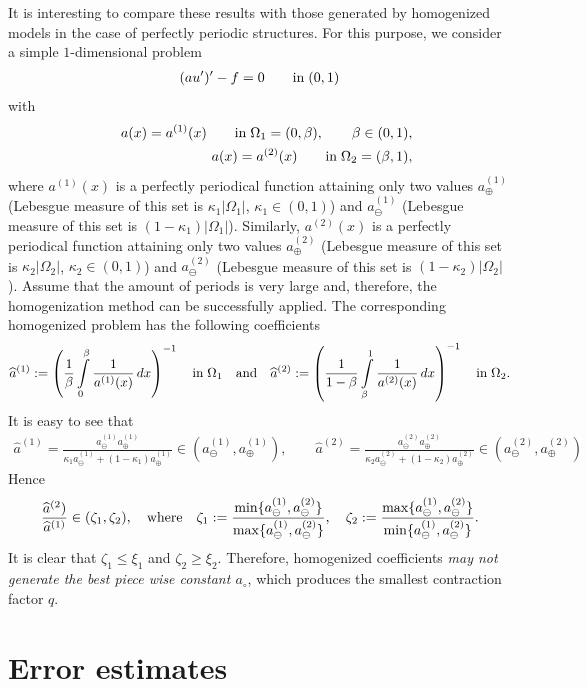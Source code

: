 \documentclass[amstex,amstext,amsfonts,epsf,12pt] {amsart}
\newcommand\be{\begin{eqnarray*}}
\newcommand\ee{\end{eqnarray*}}
\def\be{\begin{eqnarray*}}
\def\ee{\end{eqnarray*}}
\def\wh{\widehat}
\begin{document}
It is interesting to compare these results with those generated
by homogenized models in the case of perfectly periodic structures. For this purpose, we consider a simple $1$-dimensional problem
\be 
(a u^\prime)^\prime-f=0\qquad{\rm in}\;(0,1)
\ee
with
\be 
&&a(x)=a^{(1)}(x)\qquad {\rm in}\;\Omega_1=(0,\beta),\qquad\beta\in (0,1),\\
&&a(x)=a^{(2)}(x)\qquad {\rm in}\;\Omega_2=(\beta,1),
\ee
where $a^{(1)}(x)$ is a perfectly periodical function
attaining only two values $a^{(1)}_\oplus$ (Lebesgue measure
of this set is $\kappa_1|\Omega_1|$, $\kappa_1\in (0,1)$) and 
$a^{(1)}_\ominus$ (Lebesgue measure
of this set is $(1-\kappa_1)|\Omega_1|$). Similarly, 
$a^{(2)}(x)$ is a perfectly periodical function
attaining only two values $a^{(2)}_\oplus$ (Lebesgue measure
of this set is $\kappa_2|\Omega_2|$, $\kappa_2\in (0,1)$) and 
$a^{(2)}_\ominus$ (Lebesgue measure
of this set is $(1-\kappa_2)|\Omega_2|$). Assume that the amount of periods
is very large and, therefore, the homogenization method can be successfully applied. The corresponding  homogenized problem has the following coefficients
\be 
\wh a^{(1)}:=\left(\frac{1}{\beta}\int\limits^{\beta}_0\frac{1}{a^{(1)}(x)}\,dx\right)^{-1}\quad{\rm in}\;\Omega_1\quad{\rm and}\quad
\wh a^{(2)}:=\left(\frac{1}{1-\beta}\int\limits^{1}_{\beta}\frac{1}{a^{(2)}(x)}\,dx\right)^{-1}\quad{\rm in}\;\Omega_2.
\ee
It is easy to see that
\be 
\wh a^{(1)}=\frac{a^{(1)}_\ominus a^{(1)}_\oplus}{\kappa_1 a^{(1)}_\ominus+(1-\kappa_1)a^{(1)}_\oplus}\in (a^{(1)}_\ominus,a^{(1)}_\oplus),\qquad
\wh a^{(2)}=\frac{a^{(2)}_\ominus a^{(2)}_\oplus}{\kappa_2 a^{(2)}_\ominus+(1-\kappa_2)a^{(2)}_\oplus}
\in (a^{(2)}_\ominus,a^{(2)}_\oplus)
\ee
Hence
\be 
\frac{\wh a^{(2})}{\wh a^{(1)}}\in (\zeta_1,\zeta_2), 
\quad{\rm where}\quad
\zeta_1:=\frac{\min\{a^{(1)}_\ominus,a^{(2)}_\ominus\}}
{\max\{a^{(1)}_\ominus,a^{(2)}_\ominus\}},\quad
\zeta_2:=\frac{\max\{a^{(1)}_\ominus,a^{(2)}_\ominus\}}
{\min\{a^{(1)}_\ominus,a^{(2)}_\ominus\}}.
\ee
It is clear that $\zeta_1\leq\xi_1$ and $\zeta_2\geq\xi_2$. 
Therefore, homogenized coefficients {\em may not generate the best
piece wise constant $a_\circ$}, which produces the smallest
contraction factor $q$.



\section{Error estimates}
\end{document}
